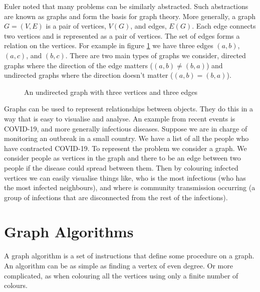 Euler noted that many problems can be similarly abstracted. Such abstractions are known as graphs and form the basis for graph theory. More generally, a graph $G=(V,E)$ is a pair of vertices, $V(G)$, and edges, $E(G)$. Each edge connects two vertices and is represented as a pair of vertices. The set of edges forms a relation on the vertices. For example in figure \ref{fig:k3} we have three edges $(a,b)$, $(a,c)$, and $(b,c)$. There are two main types of graphs we consider, directed graphs where the direction of the edge matters ($(a,b)\neq (b,a)$) and undirected graphs where the direction doesn't matter ($(a,b)=(b,a)$). 

\begin{figure}[h]
    \centering
{}
    \caption{An undirected graph with three vertices and three edges}
\label{fig:k3}
\end{figure}
   
Graphs can be used to represent relationships between objects. They do this in a way that is easy to visualise and analyse. An example from recent events is COVID-19, and more generally infectious diseases.  Suppose we are in charge of monitoring an outbreak in a small country. We have a list of all the people who have contracted COVID-19. To represent the problem we consider a graph. We consider people as vertices in the graph and there to be an edge between two people if the disease could spread between them.
Then by colouring infected vertices we can easily visualise things like, who is the most infectious (who has the most infected neighbours), and where is community transmission occurring (a group of infections that are disconnected from the rest of the infections).
  
\section{Graph Algorithms}
A graph algorithm is a set of instructions that define some procedure on a graph. An algorithm can be as simple as finding a vertex of even degree. Or more complicated, as when colouring all the vertices using only a finite number of colours.  


